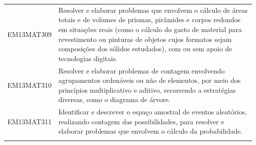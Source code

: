 \documentclass[12pt]{extarticle}
\begin{document}
\begin{longtable}{ll}
EM13MAT309 & Resolver e elaborar problemas que envolvem o cálculo de áreas totais e de volumes de prismas, pirâmides e corpos redondos em situações reais (como o cálculo do gasto de material para revestimento ou pinturas de objetos cujos formatos sejam composições dos sólidos estudados), com ou sem apoio de tecnologias digitais.                                                                                                                                                                                                                                                                                                                                                                                                                                                                                         \\
\rowcolor[HTML]{FFF} 
EM13MAT310 & Resolver e elaborar problemas de contagem envolvendo agrupamentos ordenáveis ou não de elementos, por meio dos princípios multiplicativo e aditivo, recorrendo a estratégias diversas, como o diagrama de árvore.                                                                                                                                                                                                                                                                                                                                                                                                                                                                                                                                                                                                     \\
\rowcolor[HTML]{E0F7FA} 
EM13MAT311 & Identificar e descrever o espaço amostral de eventos aleatórios, realizando contagem das possibilidades, para resolver e elaborar problemas que envolvem o cálculo da probabilidade.                                                                                                                                                                                                                                                                                                                                                                                                                                                                                                                                                                                                                                  \\
\rowcolor[HTML]{FFF} 

\end{longtable}
\end{document}
